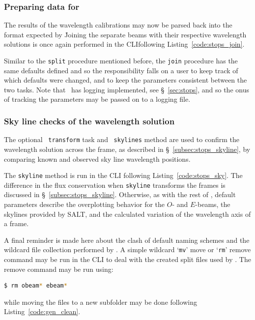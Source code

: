 \subsubsection{Preparing data for \polsalt}

The results of the wavelength calibrations may now be parsed back into the format expected by \polsalt\. Joining the separate beams with their respective wavelength solutions is once again performed in the \gls{CLI}following Listing~\ref{code:stops_join}.

Similar to the \texttt{split} procedure mentioned before, the \texttt{join} procedure has the same defaults defined and so the responsibility falls on a user to keep track of which defaults were changed, and to keep the parameters consistent between the two tasks. Note that \stops\ has logging implemented, see \S~\ref{sec:stops}, and so the onus of tracking the parameters may be passed on to a logging file.

\subsubsection{Sky line checks of the wavelength solution}

The optional \iraf\ \texttt{transform} task and \stops\ \texttt{skylines} method are used to confirm the wavelength solution across the frame, as described in \S~\ref{subsec:stops_skyline}, by comparing known and observed sky line wavelength positions.

The \texttt{skyline} method is run in the \gls{CLI} following Listing~\ref{code:stops_sky}. The difference in the flux conservation when \texttt{skyline} transforms the frames is discussed in \S~\ref{subsec:stops_skyline}. Otherwise, as with the rest of \stops, default parameters describe the overplotting behavior for the $O$- and $E$-beams, the skylines provided by \gls{SALT}, and the calculated variation of the wavelength axis of a frame.

A final reminder is made here about the clash of default naming schemes and the wildcard file collection performed by \polsalt. A simple wildcard `\texttt{mv}' move or `\texttt{rm}' remove command may be run in the \gls{CLI} to deal with the created split files used by \iraf. The remove command may be run using:
\begin{lstlisting}[language=bash]
$ rm obeam* ebeam*
\end{lstlisting}
{\parskip=0pt while} moving the files to a new subfolder may be done following Listing~\ref{code:gen_clean}.

